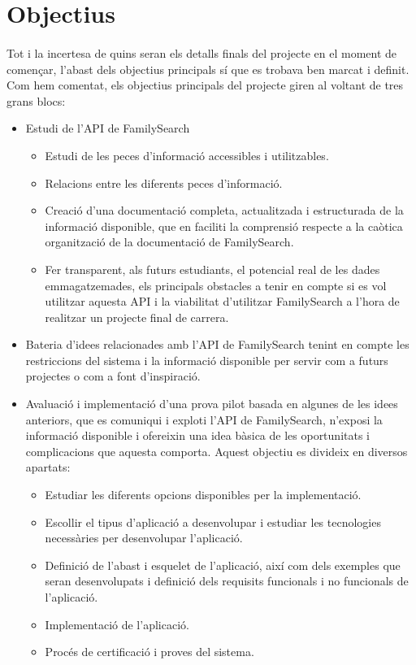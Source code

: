 \section{Objectius}

    \paragraph{}
    Tot i la incertesa de quins seran els detalls finals del projecte en el moment de començar, l’abast dels objectius principals sí que es trobava ben marcat i definit. Com hem comentat, els objectius principals del projecte giren al voltant de tres grans blocs:

    \begin{itemize}
        \item Estudi de l’\gls{API} de FamilySearch
        \begin{itemize}
            \item Estudi de les peces d’informació accessibles i utilitzables.
            \item Relacions entre les diferents peces d’informació.
            \item Creació d'una documentació completa, actualitzada i estructurada de la informació disponible, que en faciliti la comprensió respecte a la caòtica organització de la documentació de FamilySearch.
            \item Fer transparent, als futurs estudiants, el potencial real de les dades emmagatzemades, els principals obstacles a tenir en compte si es vol utilitzar aquesta API i la viabilitat d’utilitzar FamilySearch a l’hora de realitzar un projecte final de carrera.
        \end{itemize}
        \item Bateria d'idees relacionades amb l’\gls{API} de FamilySearch tenint en compte les restriccions del sistema i la informació disponible per servir com a futurs projectes o com a font d'inspiració.
        \item Avaluació i implementació d'una prova pilot basada en algunes de les idees anteriors, que es comuniqui i exploti l’\gls{API} de FamilySearch, n’exposi la informació disponible i ofereixin una idea bàsica de les oportunitats i complicacions que aquesta comporta. Aquest objectiu es divideix en diversos apartats:
        \begin{itemize}
            \item Estudiar les diferents opcions disponibles per la implementació.
            \item Escollir el tipus d’aplicació a desenvolupar i estudiar les tecnologies necessàries per desenvolupar l'aplicació.
            \item Definició de l’abast i esquelet de l’aplicació, així com dels exemples que seran desenvolupats i definició dels requisits funcionals i no funcionals de l'aplicació.
            \item Implementació de l’aplicació.
            \item Procés de certificació i proves del sistema.
        \end{itemize}
    \end{itemize}


